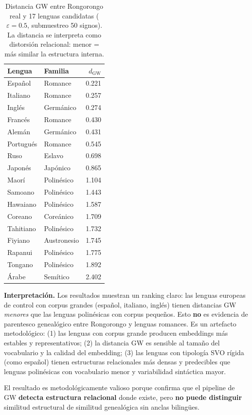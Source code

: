 \documentclass[11pt,a4paper]{article}
\newcommand{\1}{\mathbf{1}}
\numberwithin{equation}{section}
\begin{document}
\begin{table}[h]
\centering
\caption{Distancia GW entre Rongorongo real y 17 lenguas candidatas ($\varepsilon=0.5$, submuestreo 50 signos). La distancia se interpreta como distorsión relacional: menor = más similar la estructura interna.}
\label{tab:gw_17candidates}
\begin{tabular}{llr}
\toprule
Lengua & Familia & $d_{\text{GW}}$ \\
\midrule
Español & Romance & 0.221 \\
Italiano & Romance & 0.257 \\
Inglés & Germánico & 0.274 \\
Francés & Romance & 0.430 \\
Alemán & Germánico & 0.431 \\
Portugués & Romance & 0.545 \\
Ruso & Eslavo & 0.698 \\
Japonés & Japónico & 0.865 \\
Maorí & Polinésico & 1.104 \\
Samoano & Polinésico & 1.443 \\
Hawaiano & Polinésico & 1.587 \\
Coreano & Coreánico & 1.709 \\
Tahitiano & Polinésico & 1.732 \\
Fiyiano & Austronesio & 1.745 \\
Rapanui & Polinésico & 1.775 \\
Tongano & Polinésico & 1.892 \\
Árabe & Semítico & 2.402 \\
\bottomrule
\end{tabular}
\end{table}

\textbf{Interpretación.} Los resultados muestran un ranking claro: las lenguas europeas de control con corpus grandes (español, italiano, inglés) tienen distancias GW \emph{menores} que las lenguas polinésicas con corpus pequeños. Esto \textbf{no} es evidencia de parentesco genealógico entre Rongorongo y lenguas romances. Es un artefacto metodológico: (1) las lenguas con corpus grande producen embeddings más estables y representativos; (2) la distancia GW es sensible al tamaño del vocabulario y la calidad del embedding; (3) las lenguas con tipología SVO rígida (como español) tienen estructuras relacionales más densas y predecibles que lenguas polinésicas con vocabulario menor y variabilidad sintáctica mayor.

El resultado es metodológicamente valioso porque confirma que el pipeline de GW \textbf{detecta estructura relacional} donde existe, pero \textbf{no puede distinguir} similitud estructural de similitud genealógica sin anclas bilingües.
\end{document}
